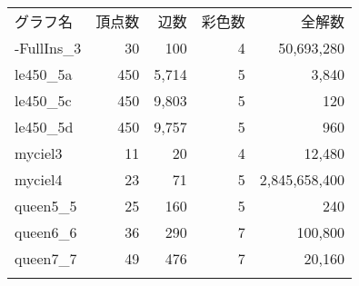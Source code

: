 \begin{tabular}[t]{l|rrr|r} \bhline
  グラフ名 & 頂点数 & 辺数 & 彩色数 & 全解数 \\ \bhline
  1-FullIns\_3 & 30 & 100 & 4 & 50,693,280 \\ 
  le450\_5a & 450 & 5,714 & 5 & 3,840 \\ 
  le450\_5c & 450 & 9,803 & 5 & 120 \\ 
  le450\_5d & 450 & 9,757 & 5 & 960 \\ 
  myciel3 & 11 & 20 & 4 & 12,480 \\ 
  myciel4 & 23 & 71 & 5 & 2,845,658,400 \\ 
  queen5\_5 & 25 & 160 & 5 & 240 \\ 
  queen6\_6 & 36 & 290 & 7 & 100,800 \\ 
  queen7\_7 & 49 & 476 & 7 & 20,160 \\ \bhline
\end{tabular}